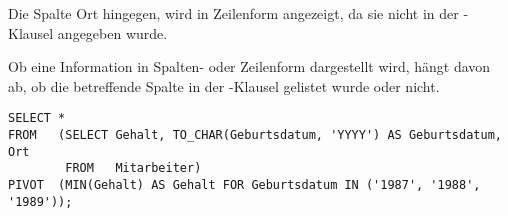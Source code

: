          Die Spalte Ort hingegen, wird in Zeilenform angezeigt, da sie nicht in der -Klausel angegeben wurde.
          \begin{merke}
            Ob eine Information in Spalten- oder Zeilenform dargestellt wird, h\"angt davon ab, ob die betreffende Spalte in der -Klausel gelistet wurde oder nicht.
          \end{merke}
          \begin{lstlisting}[language=oracle_sql,caption={Zus\"atzliche Gruppierungen in einer Pivot-Abfrage},label=sql06_21]
SELECT *
FROM   (SELECT Gehalt, TO_CHAR(Geburtsdatum, 'YYYY') AS Geburtsdatum, Ort
        FROM   Mitarbeiter)
PIVOT  (MIN(Gehalt) AS Gehalt FOR Geburtsdatum IN ('1987', '1988', '1989'));
          \end{lstlisting}
\clearpage
